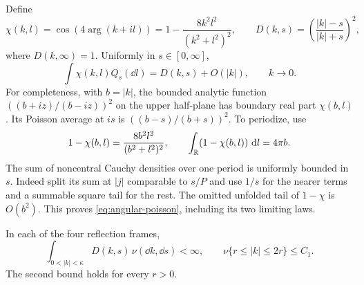 Define
\[
 \chi(k,l)=\cos(4\arg(k+il))
       =1-\frac{8k^2l^2}{(k^2+l^2)^2},\qquad
 D(k,s)=\left(\frac{|k|-s}{|k|+s}\right)^2,
\]
where $D(k,\infty)=1$. Uniformly in $s\in[0,\infty]$,
\begin{equation}
 \int\chi(k,l)Q_s(\dd l)=D(k,s)+O(|k|),\qquad k\longrightarrow0.
 \label{eq:angular-poisson}
\end{equation}
For completeness, with $b=|k|$, the bounded analytic function
$((b+iz)/(b-iz))^2$ on the upper half-plane has boundary real part
$\chi(b,l)$. Its Poisson average at $is$ is $((b-s)/(b+s))^2$.
To periodize, use
\[
 1-\chi(b,l)=\frac{8b^2l^2}{(b^2+l^2)^2},\qquad
 \int_\mathbb R(1-\chi(b,l))\,\,\mathrm d l=4\pi b.
\]
The sum of noncentral Cauchy densities over one period is uniformly bounded
in $s$. Indeed split its sum at $|j|$ comparable to $s/P$ and use $1/s$
for the nearer terms and a summable square tail for the rest. The omitted
unfolded tail of $1-\chi$ is $O(b^2)$. This proves
\cref{eq:angular-poisson}, including its two limiting laws.

\begin{proposition}
\label{prop:dispersion-defect}
In each of the four reflection frames,
\begin{equation}
 \int_{0<|k|<\kappa}D(k,s)\,\nu(\dd k,\dd s)<\infty,
 \qquad
 \nu\{r\le|k|\le2r\}\le C_1.
 \label{eq:dispersion-defect}
\end{equation}
The second bound holds for every $r>0$.
\end{proposition}

